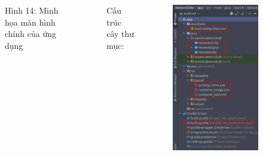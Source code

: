 \documentclass{beamer}
\begin{document}
\begin{frame}
\begin{columns}
\begin{figure}
            \caption{\centering\tiny{Hình 14: Minh họa màn hình chính của ứng dụng}}
        \end{figure}
        \indent Cấu trúc cây thư mục:
        \begin{figure}
            \centering
            \includegraphics[height=0.68\textheight]{images/11.png}
        \end{figure}
    \end{columns}
\end{frame}
\end{document}
